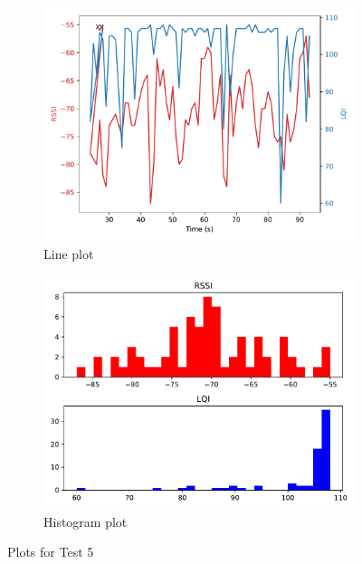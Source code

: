 \documentclass[runningheads]{llncs}
\begin{document}
\begin{figure}[ht]
    \centering
    \begin{subfigure}[b]{0.45\textwidth}
        \centering
        \includegraphics[width=\textwidth]{images/1-50-0-11-line.pdf}
        \caption{Line plot}
    \end{subfigure}
    \hfill
    \begin{subfigure}[b]{0.45\textwidth}
        \centering
        \includegraphics[width=\textwidth]{images/1-50-0-11-histogram.pdf}
        \caption{Histogram plot}
    \end{subfigure}
    \caption{Plots for Test 5}
\end{figure}
\end{document}
